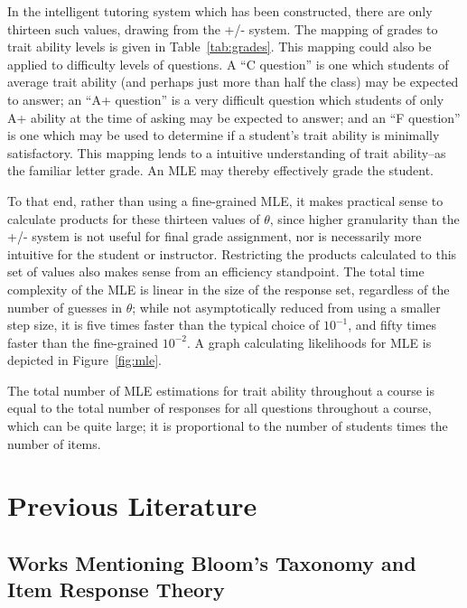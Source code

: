 In the intelligent tutoring system which has been constructed, there are only
thirteen such values, drawing from the +/- system.  The mapping of grades to
trait ability levels is given in Table~\ref{tab:grades}.  This mapping could
also be applied to difficulty levels of questions.  A ``C question'' is one
which students of average trait ability (and perhaps just more than half the
class) may be expected to answer; an ``A+ question'' is a very difficult
question which students of only A+ ability at the time of asking may be
expected to answer; and an ``F question'' is one which may be used to determine
if a student's trait ability is minimally satisfactory.  This mapping lends to
a intuitive understanding of trait ability--as the familiar letter grade.  An
MLE may thereby effectively grade the student.


To that end, rather than using a fine-grained MLE, it makes practical sense to
calculate products for these thirteen values of $\theta$, since higher
granularity than the +/- system is not useful for final grade assignment, nor
is necessarily more intuitive for the student or instructor.  Restricting the
products calculated to this set of values also makes sense from an efficiency
standpoint.  The total time complexity of the MLE is linear in the size of the
response set, regardless of the number of guesses in $\theta$; while not
asymptotically reduced from using a smaller step size, it is five times faster
than the typical choice of $10^{-1}$, and fifty times faster than the
fine-grained $10^{-2}$.  A graph calculating likelihoods for MLE is depicted in
Figure~\ref{fig:mle}.


The total number of MLE estimations for trait ability throughout a course is
equal to the total number of responses for all questions throughout a course,
which can be quite large; it is proportional to the number of students times
the number of items. 


\section{Previous Literature}

\subsection{Works Mentioning Bloom's Taxonomy and Item Response Theory}

